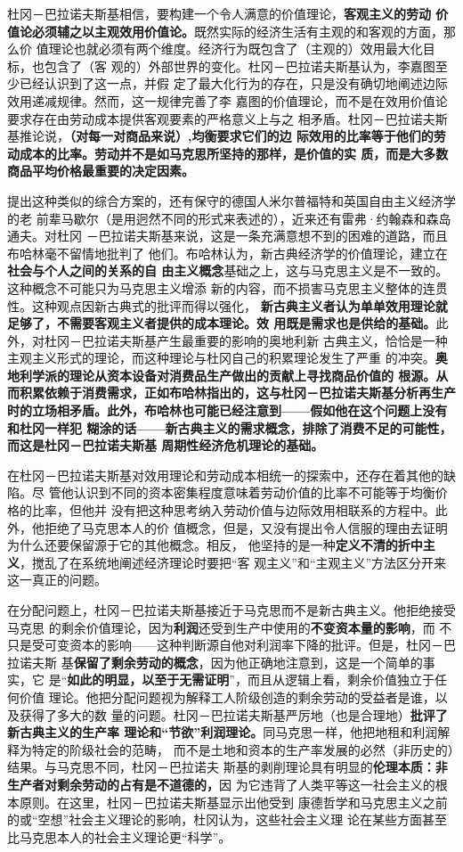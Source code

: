 杜冈－巴拉诺夫斯基相信，要构建一个令人满意的价值理论，\textbf{客观主义的劳动
价值论必须辅之以主观效用价值论。}既然实际的经济生活有主观的和客观的方面，那么价
值理论也就必须有两个维度。经济行为既包含了（主观的）效用最大化目标，也包含了（客
观的）外部世界的变化。杜冈－巴拉诺夫斯基认为，李嘉图至少已经认识到了这一点，并假
定了最大化行为的存在，只是没有确切地阐述边际效用递减规律。然而，这一规律完善了李
嘉图的价值理论，而不是在效用价值论要求存在由劳动成本提供客观要素的严格意义上与之
相矛盾。杜冈－巴拉诺夫斯基推论说，\textbf{（对每一对商品来说）,均衡要求它们的边
际效用的比率等于他们的劳动成本的比率。劳动并不是如马克思所坚持的那样，是价值的实
质，而是大多数商品平均价格最重要的决定因素。}


提出这种类似的综合方案的，还有保守的德国人米尔普福特和英国自由主义经济学的老
前辈马歇尔（是用迥然不同的形式来表述的），近来还有雷弗·约翰森和森岛通夫。对杜冈
－巴拉诺夫斯基来说，这是一条充满意想不到的困难的道路，而且布哈林毫不留情地批判了
他们。布哈林认为，新古典经济学的价值理论，建立在\textbf{社会与个人之间的关系的自
由主义概念}基础之上，这与马克思主义是不一致的。这种概念不可能只为马克思主义增添
新的内容，而不损害马克思主义整体的连贯性。这种观点因新古典式的批评而得以强化，
\textbf{新古典主义者认为单单效用理论就足够了，不需要客观主义者提供的成本理论。效
用既是需求也是供给的基础。}此外，对杜冈－巴拉诺夫斯基产生最重要的影响的奥地利新
古典主义，恰恰是一种主观主义形式的理论，而这种理论与杜冈自己的积累理论发生了严重
的冲突。\textbf{奥地利学派的理论从资本设备对消费品生产做出的贡献上寻找商品价值的
根源。从而积累依赖于消费需求，正如布哈林指出的，这与杜冈－巴拉诺夫斯基分析再生产
时的立场相矛盾。此外，布哈林也可能已经注意到——假如他在这个问题上没有和杜冈一样犯
糊涂的话——新古典主义的需求概念，排除了消费不足的可能性，而这是杜冈－巴拉诺夫斯基
周期性经济危机理论的基础。}

在杜冈－巴拉诺夫斯基对效用理论和劳动成本相统一的探索中，还存在着其他的缺陷。尽
管他认识到不同的资本密集程度意味着劳动价值的比率不可能等于均衡价格的比率，但他并
没有把这种思考纳入劳动价值与边际效用相联系的方程中。此外，他拒绝了马克思本人的价
值概念，但是，又没有提出令人信服的理由去证明为什么还要保留源于它的其他概念。相反，
他坚持的是一种\textbf{定义不清的折中主义}，搅乱了在系统地阐述经济理论时要把“客
观主义”和“主观主义”方法区分开来这一真正的问题。

在分配问题上，杜冈－巴拉诺夫斯基接近于马克思而不是新古典主义。他拒绝接受马克思
的剩余价值理论，因为\textbf{利润}还受到生产中使用的\textbf{不变资本量的影响}，而
不只是受可变资本的影响——这种判断源自他对利润率下降的批评。但是，杜冈－巴拉诺夫斯
基\textbf{保留了剩余劳动的概念}，因为他正确地注意到，这是一个简单的事实，它
是“\textbf{如此的明显，以至于无需证明}”，而且从逻辑上看，剩余价值独立于任何价值
理论。他把分配问题视为解释工人阶级创造的剩余劳动的受益者是谁，以及获得了多大的数
量的问题。杜冈－巴拉诺夫斯基严厉地（也是合理地）\textbf{批评了新古典主义的生产率
  理论和“节欲”利润理论。}同马克思一样，他把地租和利润解释为特定的阶级社会的范畴，
而不是土地和资本的生产率发展的必然（非历史的）结果。与马克思不同，杜冈－巴拉诺夫
斯基的剥削理论具有明显的\textbf{伦理本质：非生产者对剩余劳动的占有是不道德的，}因
为它违背了人类平等这一社会主义的根本原则。在这里，杜冈－巴拉诺夫斯基显示出他受到
康德哲学和马克思主义之前的或“空想”社会主义理论的影响，杜冈认为，这些社会主义理
论在某些方面甚至比马克思本人的社会主义理论更“科学”。

